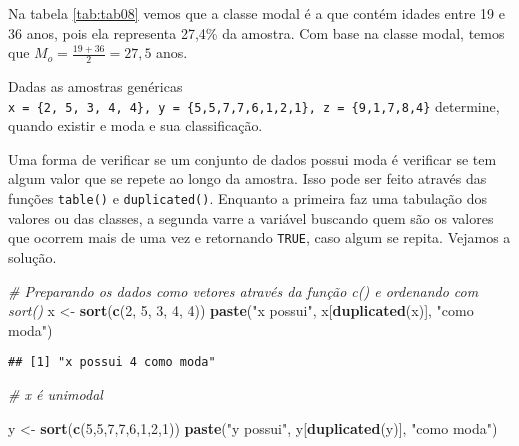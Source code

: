 \documentclass[11pt,]{style/krantz}
\makeatletter
\newenvironment{Shaded}{\begin{snugshade}}{\end{snugshade}}
\newcommand{\CommentTok}[1]{\textcolor[rgb]{0.56,0.35,0.01}{\textit{#1}}}
\newcommand{\DecValTok}[1]{\textcolor[rgb]{0.00,0.00,0.81}{#1}}
\newcommand{\KeywordTok}[1]{\textcolor[rgb]{0.13,0.29,0.53}{\textbf{#1}}}
\newcommand{\NormalTok}[1]{#1}
\newcommand{\StringTok}[1]{\textcolor[rgb]{0.31,0.60,0.02}{#1}}
\newenvironment{kframe}{%
\medskip{}
\setlength{\fboxsep}{.8em}
 \def\at@end@of@kframe{}%
 \ifinner\ifhmode%
  \def\at@end@of@kframe{\end{minipage}}%
  \begin{minipage}{\columnwidth}%
 \fi\fi%
 \def\FrameCommand##1{\hskip\@totalleftmargin \hskip-\fboxsep
 \colorbox{shadecolor}{##1}\hskip-\fboxsep
     \hskip-\linewidth \hskip-\@totalleftmargin \hskip\columnwidth}%
 \MakeFramed {\advance\hsize-\width
   \@totalleftmargin\z@ \linewidth\hsize
   \@setminipage}}%
 {\par\unskip\endMakeFramed%
 \at@end@of@kframe}
\renewenvironment{Shaded}{\begin{kframe}}{\end{kframe}}
\theoremstyle{definition}
\theoremstyle{definition}
\theoremstyle{definition}
\theoremstyle{remark}
\let\BeginKnitrBlock\begin \let\EndKnitrBlock\end
\makeatother
\begin{document}
Na tabela \ref{tab:tab08} vemos que a classe modal é a que contém idades entre 19 e 36 anos, pois ela representa 27,4\% da amostra. Com base na classe modal, temos que \(M_o = \frac{19+36}{2} = 27,5\) anos.

\BeginKnitrBlock{example}
\protect\hypertarget{exm:unnamed-chunk-56}{}{\label{exm:unnamed-chunk-56} }Dadas as amostras genéricas \texttt{x\ =\ \{2,\ 5,\ 3,\ 4,\ 4\},\ y\ =\ \{5,5,7,7,6,1,2,1\},\ z\ =\ \{9,1,7,8,4\}} determine, quando existir e moda e sua classificação.
\EndKnitrBlock{example}

\BeginKnitrBlock{solution}
\iffalse{} {Solução. } \fi{}Uma forma de verificar se um conjunto de dados possui moda é verificar se tem algum valor que se repete ao longo da amostra. Isso pode ser feito através das funções \texttt{table()} e \texttt{duplicated()}. Enquanto a primeira faz uma tabulação dos valores ou das classes, a segunda varre a variável buscando quem são os valores que ocorrem mais de uma vez e retornando \texttt{TRUE}, caso algum se repita. Vejamos a solução.
\EndKnitrBlock{solution}

\begin{Shaded}
\begin{Highlighting}[]
\CommentTok{# Preparando os dados como vetores através da função c() e ordenando com sort()}
\NormalTok{x <-}\StringTok{ }\KeywordTok{sort}\NormalTok{(}\KeywordTok{c}\NormalTok{(}\DecValTok{2}\NormalTok{, }\DecValTok{5}\NormalTok{, }\DecValTok{3}\NormalTok{, }\DecValTok{4}\NormalTok{, }\DecValTok{4}\NormalTok{))}
\KeywordTok{paste}\NormalTok{(}\StringTok{"x possui"}\NormalTok{, x[}\KeywordTok{duplicated}\NormalTok{(x)], }\StringTok{"como moda"}\NormalTok{)}
\end{Highlighting}
\end{Shaded}

\begin{verbatim}
## [1] "x possui 4 como moda"
\end{verbatim}

\begin{Shaded}
\begin{Highlighting}[]
\CommentTok{# x é unimodal}

\NormalTok{y <-}\StringTok{ }\KeywordTok{sort}\NormalTok{(}\KeywordTok{c}\NormalTok{(}\DecValTok{5}\NormalTok{,}\DecValTok{5}\NormalTok{,}\DecValTok{7}\NormalTok{,}\DecValTok{7}\NormalTok{,}\DecValTok{6}\NormalTok{,}\DecValTok{1}\NormalTok{,}\DecValTok{2}\NormalTok{,}\DecValTok{1}\NormalTok{))}
\KeywordTok{paste}\NormalTok{(}\StringTok{"y possui"}\NormalTok{, y[}\KeywordTok{duplicated}\NormalTok{(y)], }\StringTok{"como moda"}\NormalTok{)}
\end{Highlighting}
\end{Shaded}
\end{document}
